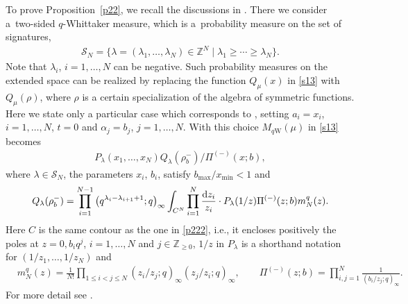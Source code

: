 \documentclass[pdftex]{sigma}
\numberwithin{equation}{section}
\def\a{\alpha}
\def\l{\lambda}
\def\S{\mathcal{S}}
\def\Z{\mathbb{Z}}
\begin{document}
To prove Proposition~\ref{p22}, we recall the discussions in \cite[Section 3]{ImamuraSasamoto2019qTASEPtheta}. There we consider a~two-sided $q$-Whittaker measure, which is a~probability measure on the set of signatures,
\begin{align*}
 \S_N=\big\{\l=(\l_1,\dots,\l_N)\in \Z^N\mid \l_1\ge\cdots\ge \l_N\big\}.
\end{align*}
Note that $\l_i$, $i=1,\dots,N$ can be negative. Such probability measures on the extended space can be realized by replacing the function $Q_{\mu}(x)$ in \eqref{s13} with $Q_{\mu}(\rho)$, where $\rho$ is a certain specialization of the algebra of symmetric functions.
Here we state only a particular case which corresponds to \cite[Definition 3.4]{ImamuraSasamoto2019qTASEPtheta}, setting $a_i=x_i$, $i=1,\dots,N$, $t=0$ and $\a_j=b_j$, $j=1,\dots,N$. With this choice $M_{q\text{W}}(\mu)$ in \eqref{s13} becomes
\begin{align}
\label{p224}
P_{\l}(x_1,\dots,x_N)Q_{\l}(\rho^{-}_b)/\Pi^{(-)}(x;b),
\end{align}
where $\l\in\S_N$, the parameters $x_i$, $b_i$,
satisfy $b_{\max}/x_{\min}<1$ and
\begin{align}
Q_\l(\rho^-_b)
 =\prod_{i=1}^{N-1}\big(q^{\l_i-\l_{i+1}+1};q\big)_{\infty}
\int_{C^N}\prod_{i=1}^N\frac{{\rm d}z_i}{z_i}\cdot
P_\l (1/z)
 \Pi^{(-)}(z;b)m_N^q(z).
\label{defQ}
\end{align}
Here $C$ is the same contour as the
one in \eqref{p222}, i.e., it encloses
positively
the poles at $z=0, b_iq^j$, $i=1,\dots,N$
and $j\in\Z_{\ge 0}$, $1/z$ in $P_\l$ is a shorthand notation for
$(1/z_1,\dots,1/z_N)$ and
\begin{align*}%
&m_N^q(z)=\frac{1}{N!}\prod_{1\le i<j\le N}(z_i/z_j;q)_{\infty}(z_j/z_i;q)_{\infty},
\qquad
\Pi^{(-)}(z;b)=\prod_{i,j=1}^N\frac{1}{(b_i/z_j;q)_{\infty}}.
\end{align*}
For more detail see \cite[Appendix B]{ImamuraSasamoto2019qTASEPtheta}.
\end{document}
